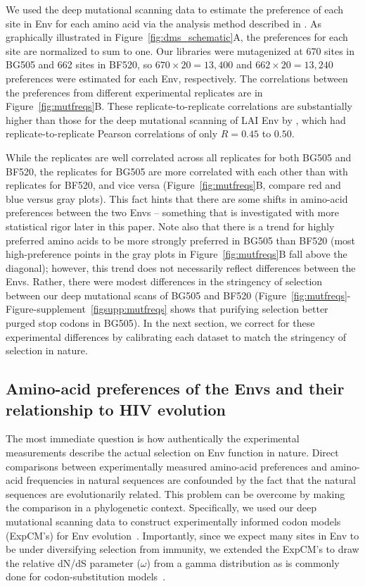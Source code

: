 \documentclass[9pt]{elife}
\begin{document}
We used the deep mutational scanning data to estimate the preference of each site in Env for each amino acid via the analysis method described in \citet{bloom2015software}.
As graphically illustrated in Figure~\ref{fig:dms_schematic}A, the preferences for each site are normalized to sum to one.
Our libraries were mutagenized at 670 sites in BG505 and 662 sites in BF520, so $670 \times 20 = 13,400$ and $662 \times 20 = 13,240$ preferences were estimated for each Env, respectively.
The correlations between the preferences from different experimental replicates are in Figure~\ref{fig:mutfreqs}B.
These replicate-to-replicate correlations are substantially higher than those for the deep mutational scanning of LAI Env by \citet{haddox2016experimental}, which had replicate-to-replicate Pearson correlations of only $R = 0.45$ to $0.50$. 

While the replicates are well correlated across all replicates for both BG505 and BF520, the replicates for BG505 are more correlated with each other than with replicates for BF520, and vice versa (Figure~\ref{fig:mutfreqs}B, compare red and blue versus gray plots).
This fact hints that there are some shifts in amino-acid preferences between the two Envs -- something that is investigated with more statistical rigor later in this paper.
Note also that there is a trend for highly preferred amino acids to be more strongly preferred in BG505 than BF520 (most high-preference points in the gray plots in Figure~\ref{fig:mutfreqs}B fall above the diagonal); however, this trend does not necessarily reflect differences between the Envs.
Rather, there were modest differences in the stringency of selection between our deep mutational scans of BG505 and BF520 (Figure~\ref{fig:mutfreqs}-Figure-supplement~\ref{figsupp:mutfreqs} shows that purifying selection better purged stop codons in BG505).
In the next section, we correct for these experimental differences by calibrating each dataset to match the stringency of selection in nature.

\subsection{Amino-acid preferences of the Envs and their relationship to HIV evolution}
The most immediate question is how authentically the experimental measurements describe the actual selection on Env function in nature.
Direct comparisons between experimentally measured amino-acid preferences and amino-acid frequencies in natural sequences are confounded by the fact that the natural sequences are evolutionarily related.
This problem can be overcome by making the comparison in a phylogenetic context.
Specifically, we used our deep mutational scanning data to construct experimentally informed codon models (ExpCM's) for Env evolution~\citep{hilton2017phydms}.
Importantly, since we expect many sites in Env to be under diversifying selection from immunity, we extended the ExpCM's to draw the relative dN/dS parameter ($\omega$) from a gamma distribution as is commonly done for codon-substitution models~\citep{yang2000codon}.
\end{document}
